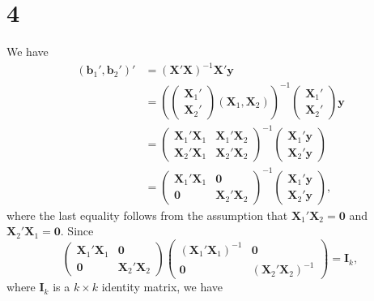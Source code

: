 \documentclass[a4paper,11pt]{article}
\begin{document}
\section*{4}
We have
\begin{align*}
    (\bm{b}_1',\bm{b}_2')'&=(\bm{X}'\bm{X})^{-1}\bm{X}'\bm{y}\\
    &=\left(\begin{pmatrix}\bm{X}_1'\\\bm{X}_2'\end{pmatrix}(\bm{X}_1,\bm{X}_2)\right)^{-1}\begin{pmatrix}\bm{X}_1'\\\bm{X}_2'\end{pmatrix}\bm{y}\\
    &=\begin{pmatrix}\bm{X}_1'\bm{X}_1&\bm{X}_1'\bm{X}_2\\\bm{X}_2'\bm{X}_1&\bm{X}_2'\bm{X}_2\end{pmatrix}^{-1}\begin{pmatrix}\bm{X}_1'\bm{y}\\\bm{X}_2'\bm{y}\end{pmatrix}\\
    &=\begin{pmatrix}\bm{X}_1'\bm{X}_1&\bm{0}\\\bm{0}&\bm{X}_2'\bm{X}_2\end{pmatrix}^{-1}\begin{pmatrix}\bm{X}_1'\bm{y}\\\bm{X}_2'\bm{y}\end{pmatrix},
\end{align*}
where the last equality follows from the assumption that $\bm{X}_1'\bm{X}_2=\bm{0}$ and $\bm{X}_2'\bm{X}_1=\bm{0}$. Since 
\begin{equation*}
    \begin{pmatrix}\bm{X}_1'\bm{X}_1&\bm{0}\\\bm{0}&\bm{X}_2'\bm{X}_2\end{pmatrix}\begin{pmatrix}(\bm{X}_1'\bm{X}_1)^{-1}&\bm{0}\\\bm{0}&(\bm{X}_2'\bm{X}_2)^{-1}\end{pmatrix}=\bm{I}_k,
\end{equation*}
where $\bm{I}_k$ is a $k\times k$ identity matrix, we have
\end{document}
